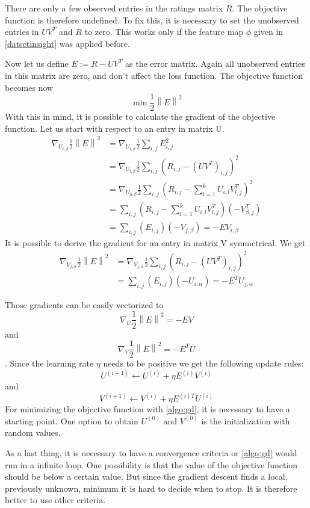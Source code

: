 \documentclass[DIV=14,twocolumn]{scrartcl}
\newcommand{\norm}[1]{\left\lVert#1\right\rVert}
\begin{document}
There are only a few observed entries in the ratings matrix $R$. The objective function is therefore undefined. To fix this, it is necessary to set the unobserved entries in $UV^T$ and $R$ to zero. This works only if the feature map $\phi$ given in \autoref{datsetinsight} was applied before. 

Now let us define $E:=R-UV^T$ as the error matrix. Again all unobserved entries in this matrix are zero, and don't affect the loss function. The objective function becomes now \[\min\frac{1}{2}\norm{E}^2\]
With this in mind, it is possible to calculate the gradient of the objective function.
Let us start with respect to an entry in matrix U.
\begin{equation*}
\begin{split}
\nabla_{U_{i,\beta}} \frac{1}{2}\norm{E}^2 &= \nabla_{U_{i,\beta}} \frac{1}{2}\sum_{i,j}E_{i,j}^2 \\ &=\nabla_{U_{i,\beta}} \frac{1}{2}\sum_{i,j}(R_{i,j}-(UV^T)_{i,j})^2 \\
&=\nabla_{U_{\alpha,\beta}} \frac{1}{2}\sum_{i,j}(R_{i,j}-\sum_{l=1}^k U_{i,l}V^T_{l,j})^2\\
&=\sum_{i,j}(R_{i,j}-\sum_{l=1}^k U_{i,l}V^T_{l,j})(-V^T_{\beta,j})\\
&=\sum_{i,j}(E_{i,j})(-V_{j,\beta})=-EV_{i,\beta} 
\end{split}
\end{equation*}
It is possible to derive the gradient for an entry in matrix V symmetrical. We get 
\begin{equation*}
\begin{split}
\nabla_{V_{j,\alpha}} \frac{1}{2}\norm{E}^2 &= \nabla_{V_{j,\alpha}} \frac{1}{2}\sum_{i,j}(R_{i,j}-(UV^T)_{i,j})^2\\
&=\sum_{i,j}(E_{i,j})(-U_{i,\alpha})=-E^TU_{j,\alpha}
\end{split}
\end{equation*}

Those gradients can be easily vectorized to $$\nabla_U \frac{1}{2}\norm{E}^2=-EV$$ and  $$\nabla_V \frac{1}{2}\norm{E}^2=-E^TU$$. Since the learning rate $\eta$ needs to be positive we get the following update rules: \[U^{(i+1)} \leftarrow U^{(i)} + \eta E^{(i)}V^{(i)}\] and \[V^{(i+1)} \leftarrow V^{(i)} + \eta E^{(i)T}U^{(i)}\]
For minimizing the objective function with \autoref{algo:gd}, it is necessary to have a starting point. One option to obtain $U^{(0)}$ and $V^{(0)}$ is the initialization with random values. 

As a last thing, it is necessary to have a convergence criteria or \autoref{algo:gd} would run in a infinite loop. One possibility is that the value of the objective function should be below a certain value. But since the gradient descent finds a local, previously unknown, minimum it is hard to decide when to stop. It is therefore better to use other criteria. 
\end{document}
